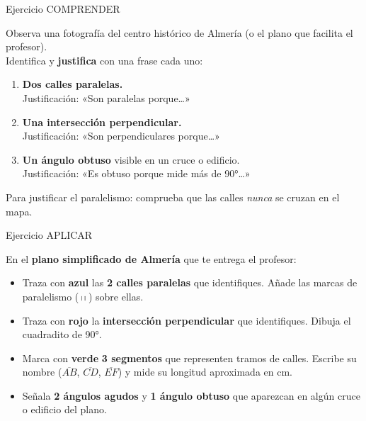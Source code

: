 \documentclass[aspectratio=169, 10pt, spanish]{beamer}
\begin{document}
\begin{frame}{Ejercicio COMPRENDER}
  \quad{}
  \vspace{4pt}
  \begin{comprenderbox}
    \AlmFontFootnote
    Observa una fotografía del centro histórico de Almería
    (o el plano que facilita el profesor).\\[6pt]
    Identifica y \textbf{justifica} con una frase cada uno:
    \begin{enumerate}
      \item \textbf{Dos calles paralelas.}\\
            Justificación: «Son paralelas porque\ldots»
      \item \textbf{Una intersección perpendicular.}\\
            Justificación: «Son perpendiculares porque\ldots»
      \item \textbf{Un ángulo obtuso} visible en un cruce o edificio.\\
            Justificación: «Es obtuso porque mide más de 90°\ldots»
    \end{enumerate}
    \vspace{4pt}
    \begin{notabox}[Pista]
      \AlmFontFootnote
      Para justificar el paralelismo: comprueba que
      las calles \emph{nunca} se cruzan en el mapa.
    \end{notabox}
  \end{comprenderbox}
\end{frame}

\begin{frame}{Ejercicio APLICAR}
  \quad{}
  \vspace{4pt}
  \begin{aplicarbox}
    \AlmFontFootnote
    En el \textbf{plano simplificado de Almería} que te
    entrega el profesor:
    \begin{itemize}
      \item Traza con \textcolor{AlmAzulM}{\textbf{azul}}
            las \textbf{2 calles paralelas} que identifiques.
            Añade las marcas de paralelismo
            (\,$\shortmid$\;$\shortmid$\,) sobre ellas.
      \item Traza con \textcolor{AlmTerra}{\textbf{rojo}}
            la \textbf{intersección perpendicular} que
            identifiques. Dibuja el cuadradito de 90°.
      \item Marca con \textcolor{AlmVerde}{\textbf{verde}}
            \textbf{3 segmentos} que representen tramos de calles.
            Escribe su nombre ($\overline{AB}$, $\overline{CD}$,
            $\overline{EF}$) y mide su longitud aproximada en cm.
      \item Señala \textbf{2 ángulos agudos} y \textbf{1 ángulo obtuso}
            que aparezcan en algún cruce o edificio del plano.
    \end{itemize}
  \end{aplicarbox}
\end{frame}
\end{document}
